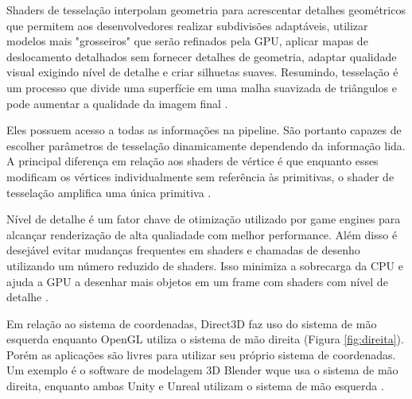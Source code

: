 Shaders de tesselação interpolam geometria para acrescentar detalhes geométricos que permitem aos desenvolvedores realizar subdivisões adaptáveis, utilizar modelos mais "grosseiros" que serão refinados pela GPU, aplicar mapas de deslocamento detalhados sem fornecer detalhes de geometria, adaptar qualidade visual exigindo nível de detalhe e criar silhuetas suaves. Resumindo, tesselação é um processo que divide uma superfície em uma malha suavizada de triângulos e pode aumentar a qualidade da imagem final \cite{hasu2018modern}.

Eles possuem acesso a todas as informações na pipeline. São portanto capazes de escolher parâmetros de tesselação dinamicamente dependendo da informação lida. A principal diferença em relação aos shaders de vértice é que enquanto esses modificam os vértices individualmente sem referência às primitivas, o shader de tesselação amplifica uma única primitiva \cite{hasu2018modern}.

Nível de detalhe é um fator chave de otimização utilizado por game engines para alcançar renderização de alta qualiadade com melhor performance. Além disso é desejável evitar mudanças frequentes em shaders e chamadas de desenho utilizando um número reduzido de shaders. Isso minimiza a sobrecarga da CPU e ajuda a GPU a desenhar mais objetos em um frame com shaders com nível de detalhe \cite{yong2015rapid}.

Em relação ao sistema de coordenadas, Direct3D faz uso do sistema de mão esquerda enquanto OpenGL utiliza o sistema de mão direita (Figura \ref{fig:direita}). Porém as aplicações são livres para utilizar seu próprio sistema de coordenadas. Um exemplo é o software de modelagem 3D Blender wque usa o sistema de mão direita, enquanto ambas Unity e Unreal utilizam o sistema de mão esquerda \cite{hasu2018modern}.

	\begin{figure}[h!]
		\centering
	\end{figure}
	\nocite{direita}

